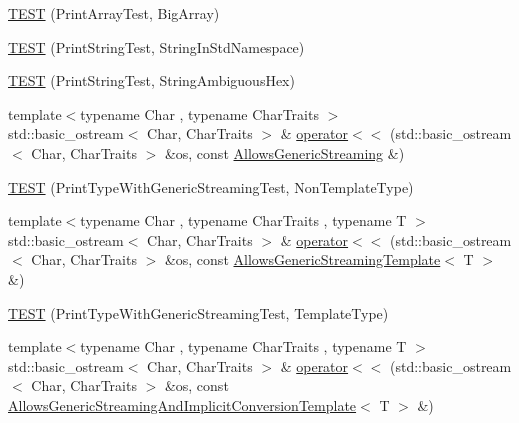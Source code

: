 \begin{DoxyCompactItemize}
\item 
\mbox{\hyperlink{namespacetesting_1_1gtest__printers__test_a596493b56489aa1571fa26d1402e7116}{T\+E\+ST}} (Print\+Array\+Test, Big\+Array)
\item 
\mbox{\hyperlink{namespacetesting_1_1gtest__printers__test_abbd355e76033f0defd76c37523ad0f60}{T\+E\+ST}} (Print\+String\+Test, String\+In\+Std\+Namespace)
\item 
\mbox{\hyperlink{namespacetesting_1_1gtest__printers__test_ac20ee165500471e363011c3f664d2fb8}{T\+E\+ST}} (Print\+String\+Test, String\+Ambiguous\+Hex)
\item 
{\footnotesize template$<$typename Char , typename Char\+Traits $>$ }\\std\+::basic\+\_\+ostream$<$ Char, Char\+Traits $>$ \& \mbox{\hyperlink{namespacetesting_1_1gtest__printers__test_a55578d45fb44ffa9660db56546150889}{operator$<$$<$}} (std\+::basic\+\_\+ostream$<$ Char, Char\+Traits $>$ \&os, const \mbox{\hyperlink{classtesting_1_1gtest__printers__test_1_1_allows_generic_streaming}{Allows\+Generic\+Streaming}} \&)
\item 
\mbox{\hyperlink{namespacetesting_1_1gtest__printers__test_a9272037c799c4779e1d79476dad66cb6}{T\+E\+ST}} (Print\+Type\+With\+Generic\+Streaming\+Test, Non\+Template\+Type)
\item 
{\footnotesize template$<$typename Char , typename Char\+Traits , typename T $>$ }\\std\+::basic\+\_\+ostream$<$ Char, Char\+Traits $>$ \& \mbox{\hyperlink{namespacetesting_1_1gtest__printers__test_a4f5bb6b21a29bf99df1e27a1876d921c}{operator$<$$<$}} (std\+::basic\+\_\+ostream$<$ Char, Char\+Traits $>$ \&os, const \mbox{\hyperlink{classtesting_1_1gtest__printers__test_1_1_allows_generic_streaming_template}{Allows\+Generic\+Streaming\+Template}}$<$ T $>$ \&)
\item 
\mbox{\hyperlink{namespacetesting_1_1gtest__printers__test_a6e180c85f307712a995985f7bc735fd1}{T\+E\+ST}} (Print\+Type\+With\+Generic\+Streaming\+Test, Template\+Type)
\item 
{\footnotesize template$<$typename Char , typename Char\+Traits , typename T $>$ }\\std\+::basic\+\_\+ostream$<$ Char, Char\+Traits $>$ \& \mbox{\hyperlink{namespacetesting_1_1gtest__printers__test_aa9c63d8e146c98f3277ffba8b29b3c5e}{operator$<$$<$}} (std\+::basic\+\_\+ostream$<$ Char, Char\+Traits $>$ \&os, const \mbox{\hyperlink{classtesting_1_1gtest__printers__test_1_1_allows_generic_streaming_and_implicit_conversion_template}{Allows\+Generic\+Streaming\+And\+Implicit\+Conversion\+Template}}$<$ T $>$ \&)

\end{DoxyCompactItemize}
